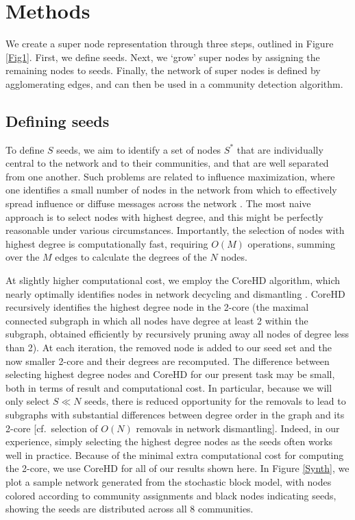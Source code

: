 \section{Methods}
We create a super node representation through three steps, outlined in Figure \ref{Fig1}. First, we define seeds. Next, we `grow' super nodes by assigning the remaining nodes to seeds. Finally, the network of super nodes is defined by agglomerating edges, and can then be used in a community detection algorithm. 
\subsection{Defining seeds}
To define $S$ seeds, we aim to identify a set of nodes $S^{*}$ that are individually central to the network and to their communities, and that are well separated from one another. Such problems are related to influence maximization, where one identifies a small number of nodes in the network from which to effectively spread influence or diffuse messages across the network \cite{jungirie,kempe}. The most naive approach is to select nodes with highest degree, and this might be perfectly reasonable under various circumstances. Importantly, the selection of nodes with highest degree is computationally fast, requiring $O(M)$ operations, summing over the $M$ edges to calculate the degrees of the $N$ nodes. 

At slightly higher computational cost, we employ the CoreHD algorithm, which nearly optimally identifies nodes in network decycling and dismantling \cite{CoreHD}. CoreHD recursively identifies the highest degree node in the 2-core (the maximal connected subgraph in which all nodes have degree at least 2 within the subgraph, obtained efficiently by recursively pruning away all nodes of degree less than 2). At each iteration, the removed node is added to our seed set and the now smaller 2-core and their degrees are recomputed. The difference between selecting highest degree nodes and CoreHD for our present task may be small, both in terms of result and computational cost. In particular, because we will only select $S\ll N$ seeds, there is reduced opportunity for the removals to lead to subgraphs with substantial differences between degree order in the graph and its 2-core [cf.\ selection of $O(N)$ removals in network dismantling]. Indeed, in our experience, simply selecting the highest degree nodes as the seeds often works well in practice. Because of the minimal extra computational cost for computing the 2-core, we use CoreHD for all of our results shown here. In Figure \ref{Synth}, we plot a sample network generated from the stochastic block model, with nodes colored according to community assignments and black nodes indicating seeds, showing the seeds are distributed across all 8 communities. 

